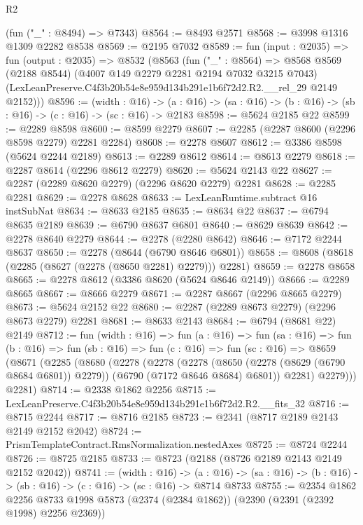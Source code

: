 \begin{lexlean}{R2}
\begin{coremodule}
    (fun ("_" : @8494) => @7343)
@8564 := @8493 @2571
@8568 := @3998 @1316 @1309 @2282 @8538
@8569 := @2195 @7032
@8589 := fun (input : @2035) =>
  fun (output : @2035) =>
  @8532
    (@8563
      (fun ("_" : @8564) =>
      @8568
        @8569
        (@2188 @8544)
        (@4007 @149 @2279 @2281 @2194 @7032 @3215 @7043)
        (LexLeanPreserve.C4f3b20b54e8e959d134b291e1b6f72d2.R2.__rel_29 @2149 @2152)))
@8596 := (width : @16) ->
  (a : @16) -> (sa : @16) -> (b : @16) -> (sb : @16) -> (c : @16) -> (sc : @16) -> @2183
@8598 := @5624 @2185 @22
@8599 := @2289 @8598
@8600 := @8599 @2279
@8607 := @2285 (@2287 @8600 (@2296 @8598 @2279) @2281 @2284)
@8608 := @2278 @8607
@8612 := @3386 @8598 (@5624 @2244 @2189)
@8613 := @2289 @8612
@8614 := @8613 @2279
@8618 := @2287 @8614 (@2296 @8612 @2279)
@8620 := @5624 @2143 @22
@8627 := @2287 (@2289 @8620 @2279) (@2296 @8620 @2279) @2281
@8628 := @2285 @2281
@8629 := @2278 @8628
@8633 := LexLeanRuntime.subtract @16 instSubNat
@8634 := @8633 @2185
@8635 := @8634 @22
@8637 := @6794 @8635 @2189
@8639 := @6790 @8637 @6801
@8640 := @8629 @8639
@8642 := @2278 @8640 @2279
@8644 := @2278 (@2280 @8642)
@8646 := @7172 @2244 @8637
@8650 := @2278 (@8644 (@6790 @8646 @6801))
@8658 := @8608 (@8618 (@2285 (@8627 (@2278 (@8650 @2281) @2279))) @2281)
@8659 := @2278 @8658
@8665 := @2278 @8612 (@3386 @8620 (@5624 @8646 @2149))
@8666 := @2289 @8665
@8667 := @8666 @2279
@8671 := @2287 @8667 (@2296 @8665 @2279)
@8673 := @5624 @2152 @22
@8680 := @2287 (@2289 @8673 @2279) (@2296 @8673 @2279) @2281
@8681 := @8633 @2143
@8684 := @6794 (@8681 @22) @2149
@8712 := fun (width : @16) =>
  fun (a : @16) =>
  fun (sa : @16) =>
  fun (b : @16) =>
  fun (sb : @16) =>
  fun (c : @16) =>
  fun (sc : @16) =>
  @8659
    (@8671
      (@2285
        (@8680
          (@2278
            (@2278
              (@2278
                (@8650 (@2278 (@8629 (@6790 @8684 @6801)) @2279))
                (@6790 (@7172 @8646 @8684) @6801))
              @2281)
            @2279)))
      @2281)
@8714 := @2338 @1862 @2256
@8715 := LexLeanPreserve.C4f3b20b54e8e959d134b291e1b6f72d2.R2.__fits_32
@8716 := @8715 @2244
@8717 := @8716 @2185
@8723 := @2341 (@8717 @2189 @2143 @2149 @2152 @2042)
@8724 := PrismTemplateContract.RmsNormalization.nestedAxes
@8725 := @8724 @2244
@8726 := @8725 @2185
@8733 := @8723 (@2188 (@8726 @2189 @2143 @2149 @2152 @2042))
@8741 := (width : @16) ->
  (a : @16) -> (sa : @16) -> (b : @16) -> (sb : @16) -> (c : @16) -> (sc : @16) -> @8714 @8733
@8755 := @2354
    @1862
    @2256
    @8733
    @1998
    @5873
    (@2374 (@2384 @1862))
    (@2390 (@2391 (@2392 @1998) @2256 @2369))

\end{coremodule}
\end{lexlean}

